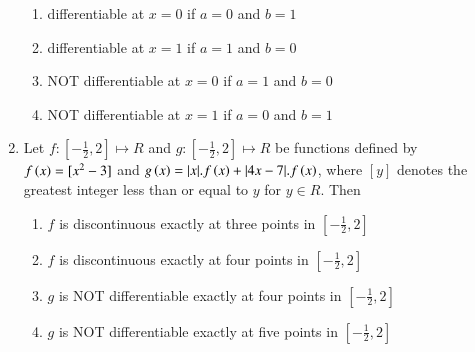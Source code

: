 \documentclass[journal,12pt,twocolumn]{IEEEtran}
\theoremstyle{remark}
\begin{document}
\begin{enumerate}
    \hfill 
    {}
    
    \begin{enumerate}[label=(\alph*)]
        
        \item differentiable at $x=0$ if $a=0$ and $b=1$
        \item differentiable at $x=1$ if $a=1$ and $b=0$
        \item {NOT} differentiable at $x=0$ if $a=1$ and $b=0$
        \item {NOT} differentiable at $x=1$ if $a=0$ and $b=1$
    \end{enumerate}


    \item 
    {Let $f:[-\frac{1}{2}, 2]\mapsto R$ and $g:[-\frac{1}{2}, 2]\mapsto R$ be functions defined by $f\left(x\right)=[x^2-3]$ and $g\left(x\right)=|x|.f\left(x\right)+|4x-7|.f\left(x\right)$, where $[y]$ denotes the greatest integer less than or equal to $y$ for $y\in R$. Then}   
        
    \hfill 
    {}
    
    \begin{enumerate}[label=(\alph*)]
        
        \item $f$ is discontinuous exactly at three points in $[-\frac{1}{2}, 2]$
        \item $f$ is discontinuous exactly at four points in $[-\frac{1}{2}, 2]$
        \item $g$ is NOT differentiable exactly at four points in $[-\frac{1}{2}, 2]$
        \item $g$ is NOT differentiable exactly at five points in $[-\frac{1}{2}, 2]$
    \end{enumerate}

\end{enumerate}
\end{document}
